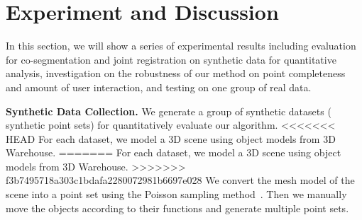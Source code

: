 \section{Experiment and Discussion}
\label{sec:results}
In this section, we will show a series of experimental results including evaluation for co-segmentation and joint registration on synthetic data for quantitative analysis, investigation on the robustness of our method on point completeness and amount of user interaction, and testing on one group of real data.

\noindent \textbf{Synthetic Data Collection.} 
We generate a group of synthetic datasets ( synthetic point sets) for quantitatively evaluate our algorithm. 
%
<<<<<<< HEAD
For each dataset, we model a 3D scene using object models from 3D Warehouse.
=======
For each dataset, we model a 3D scene using object models from 3D Warehouse. %
>>>>>>> f3b7495718a303c1bdafa2280072981b6697e028
We convert the mesh model of the scene into a point set using the Poisson sampling method~\cite{PossionSampling}.
%
Then we manually move the objects according to their functions and generate multiple point sets. 

